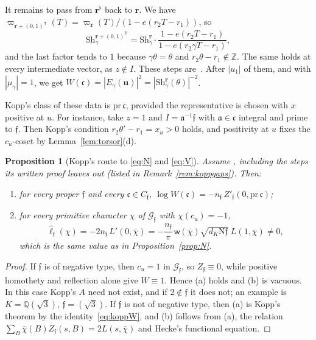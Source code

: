 \documentclass[11pt]{amsart}
\numberwithin{equation}{section}
\theoremstyle{plain}
\newtheorem{proposition}[theorem]{Proposition}
\theoremstyle{definition}
\theoremstyle{remark}
\begin{document}
It remains to pass from $\mathbf r^\flat$ back to $\mathbf r$. We have $\varpi_{\mathbf r+(0,1)^{\mathsf T}}(T)=\varpi_{\mathbf r}(T)/(1-e(r_2T-r_1))$, so
\[\mathrm{Sh}^{\mathbf r+(0,1)^{\mathsf T}}_\gamma=\mathrm{Sh}^{\mathbf r}_\gamma\cdot\frac{1-e(r_2T-r_1)}{1-e(r_2\gamma T-r_1)},\]
and the last factor tends to $1$ because $\gamma\theta=\theta$ and $r_2\theta-r_1\notin\mathbb Z$. The same holds at every intermediate vector, as $z\notin I$. These steps are~\cite[Prop.~4.35]{Ko}. After $|u_1|$ of them, and with $|\mu_\gamma|=1$, we get $W(\mathfrak c)=|E_\gamma(\mathbf u)|^2=|\mathrm{Sh}^{\mathbf r}_\gamma(\theta)|^{-2}$.

Kopp's class of these data is $\mathrm{pr}\,\mathfrak c$, provided the representative is chosen with $x$ positive at $u$. For instance, take $z=1$ and $I=\mathfrak a^{-1}\mathfrak f$ with $\mathfrak a\in\mathfrak c$ integral and prime to $\mathfrak f$. Then Kopp's condition $r_2\theta'-r_1=x_u>0$ holds, and positivity at $u$ fixes the $c_u$-coset by Lemma~\ref{lem:torsor}(d).

\begin{proposition}[Kopp's route to \eqref{eq:N} and \eqref{eq:V}]\label{prop:NKopp}
Assume \cite[Thm.~1.1]{Ko}, including the steps its written proof leaves out (listed in Remark~\ref{rem:koppgaps}). Then:
\begin{enumerate}
\item[(a)] for every proper $\mathfrak f$ and every $\mathfrak c\in C_{\mathfrak f}$, $\log W(\mathfrak c)=-n_{\mathfrak f}\,Z'_{\mathfrak f}(0,\mathrm{pr}\,\mathfrak c)$;
\item[(b)] for every primitive character $\chi$ of $\mathcal G_{\mathfrak f}$ with $\chi(c_u)=-1$,
\[\hat\ell_{\mathfrak f}(\chi)=-2n_{\mathfrak f}\,L'(0,\bar\chi)=-\frac{n_{\mathfrak f}}{\pi}\,\mathsf w(\bar\chi)\sqrt{d_K\mathrm N\mathfrak f}\;L(1,\chi)\neq0,\]
which is the same value as in Proposition~\ref{prop:N}.
\end{enumerate}
\end{proposition}

\begin{proof}
If $\mathfrak f$ is of negative type, then $c_u=1$ in $\mathcal G_{\mathfrak f}$, so $Z_{\mathfrak f}\equiv0$, while positive homothety and reflection alone give $W\equiv1$. Hence (a) holds and (b) is vacuous. In this case Kopp's $A$ need not exist, and if $2\notin\mathfrak f$ it does not; an example is $K=\mathbb Q(\sqrt3)$, $\mathfrak f=(\sqrt3)$. If $\mathfrak f$ is not of negative type, then (a) is Kopp's theorem by the identity~\eqref{eq:koppW}, and (b) follows from (a), the relation $\sum_B\bar\chi(B)Z_{\mathfrak f}(s,B)=2L(s,\bar\chi)$ and Hecke's functional equation.
\end{proof}
\end{document}
